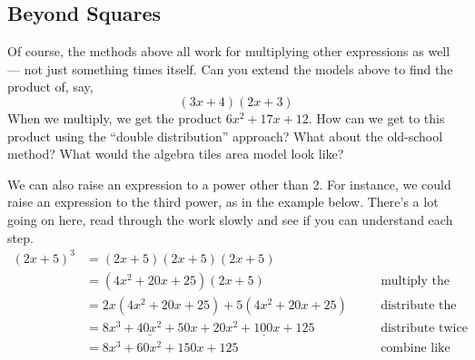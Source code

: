 \subsection{Beyond Squares}

Of course, the methods above all work for multiplying other expressions as well --- not just something times itself. Can you extend the models above to find the product of, say, \[(3x + 4)(2x + 3)\] When we multiply, we get the product $6x^2 + 17x + 12$. How can we get to this product using the ``double distribution'' approach? What about the old-school method? What would the algebra tiles area model look like?

We can also raise an expression to a power other than 2. For instance, we could raise an expression to the third power, as in the example below. There's a lot going on here, read through the work slowly and see if you can understand each step.
\[\begin{aligned}
(2x+5)^3 &= (2x+5)(2x+5)(2x+5)
\\
&= (4x^2+20x+25)(2x+5)
&&\quad\text{multiply the first two terms}
\\
&= 2x(4x^2+20x+25) + 5(4x^2+20x+25)
&&\quad\text{distribute the three-term expression!}
\\
&= \underline{8x^3 + 40x^2 + 50x} + \underline{20x^2 + 100x + 125}
&&\quad\text{distribute twice more}
\\
&= 8x^3 + 60x^2 + 150x + 125
&&\quad\text{combine like terms}
\end{aligned}\]
